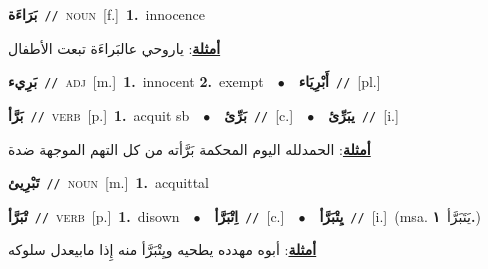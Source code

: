 \documentclass[10pt,a4paper,twoside]{article} %
\begin{document}
\begin{multicols}{2}
{\setlength\topsep{0pt}\textbf{\foreignlanguage{arabic}{بَرَاءَة}}\ {\color{gray}\texttt{//}\color{black}}\ \textsc{noun}\ [f.]\ \textbf{1.}~innocence\  \begin{flushright}\color{gray}\foreignlanguage{arabic}{\textbf{\underline{\foreignlanguage{arabic}{أمثلة}}}: ياروحي عالبَراءَة تبعت الأطفال}\end{flushright}\color{black}} \vspace{2mm}

{\setlength\topsep{0pt}\textbf{\foreignlanguage{arabic}{بَرِيء}}\ {\color{gray}\texttt{//}\color{black}}\ \textsc{adj}\ [m.]\ \textbf{1.}~innocent  \textbf{2.}~exempt\ \ $\bullet$\ \ \setlength\topsep{0pt}\textbf{\foreignlanguage{arabic}{أَبْرِيَاء}}\ {\color{gray}\texttt{//}\color{black}}\ [pl.]\ } \vspace{2mm}

{\setlength\topsep{0pt}\textbf{\foreignlanguage{arabic}{بَرَّأ}}\ {\color{gray}\texttt{//}\color{black}}\ \textsc{verb}\ [p.]\ \textbf{1.}~acquit sb\ \ $\bullet$\ \ \setlength\topsep{0pt}\textbf{\foreignlanguage{arabic}{بَرِّئ}}\ {\color{gray}\texttt{//}\color{black}}\ [c.]\ \ $\bullet$\ \ \setlength\topsep{0pt}\textbf{\foreignlanguage{arabic}{يبَرِّئ}}\ {\color{gray}\texttt{//}\color{black}}\ [i.]\  \begin{flushright}\color{gray}\foreignlanguage{arabic}{\textbf{\underline{\foreignlanguage{arabic}{أمثلة}}}: الحمدلله اليوم المحكمة بَرَّأته من كل التهم الموجهة ضدة}\end{flushright}\color{black}} \vspace{2mm}

{\setlength\topsep{0pt}\textbf{\foreignlanguage{arabic}{تَبْرِيئ}}\ {\color{gray}\texttt{//}\color{black}}\ \textsc{noun}\ [m.]\ \textbf{1.}~acquittal\ } \vspace{2mm}

{\setlength\topsep{0pt}\textbf{\foreignlanguage{arabic}{تْبَرَّأ}}\ {\color{gray}\texttt{//}\color{black}}\ \textsc{verb}\ [p.]\ \textbf{1.}~disown\ \ $\bullet$\ \ \setlength\topsep{0pt}\textbf{\foreignlanguage{arabic}{اِتْبَرَّأ}}\ {\color{gray}\texttt{//}\color{black}}\ [c.]\ \ $\bullet$\ \ \setlength\topsep{0pt}\textbf{\foreignlanguage{arabic}{يِتْبَرَّأ}}\ {\color{gray}\texttt{//}\color{black}}\ [i.]\ \color{gray}(msa. \foreignlanguage{arabic}{يَتَبَرَّأ}~\foreignlanguage{arabic}{\textbf{١.}})\color{black}\  \begin{flushright}\color{gray}\foreignlanguage{arabic}{\textbf{\underline{\foreignlanguage{arabic}{أمثلة}}}: أبوه مهدده يطحيه ويِتْبَرَّأ منه إِذا مابيعدل سلوكه}\end{flushright}\color{black}} \vspace{2mm}


\end{multicols}
\end{document}
